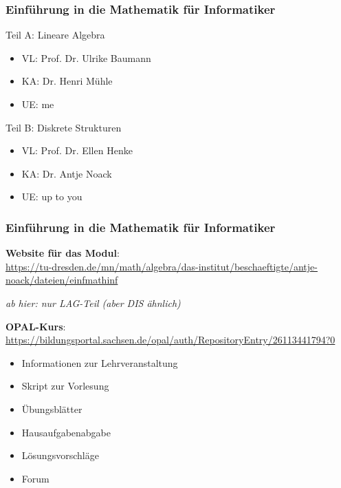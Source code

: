 \documentclass{beamer}
\begin{document}
	\begin{frame} \frametitle{Einführung in die Mathematik für Informatiker}
			\begin{alertblock}{Teil A: Lineare Algebra}
				\begin{itemize}
					\item VL: Prof. Dr. Ulrike Baumann
					\item KA: Dr. Henri Mühle
					\item UE: me %
				\end{itemize}
			\end{alertblock}
		
		\begin{block}{Teil B: Diskrete Strukturen}
			\begin{itemize}
				\item VL: Prof. Dr. Ellen Henke
				\item KA: Dr. Antje Noack
				\item UE: up to you
			\end{itemize}
		\end{block}
	\end{frame}

	\begin{frame}\frametitle{Einführung in die Mathematik für Informatiker}
		\textbf{Website für das Modul}: \\
		{\small \url{https://tu-dresden.de/mn/math/algebra/das-institut/beschaeftigte/antje-noack/dateien/einfmathinf} }
		
		\begin{center}
			\small
			\textit{ab hier: nur LAG-Teil (aber DIS ähnlich)}
		\end{center}
		
		
		\textbf{OPAL-Kurs}: \\
		{\small \url{https://bildungsportal.sachsen.de/opal/auth/RepositoryEntry/26113441794?0}}
		\begin{itemize}
			\item Informationen zur Lehrveranstaltung
			\item Skript zur Vorlesung
			\item Übungsblätter
			\item Hausaufgabenabgabe
			\item Lösungsvorschläge
			\item Forum
		\end{itemize}
	\end{frame}
\end{document}
